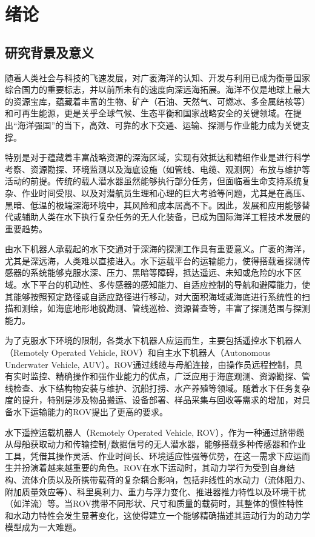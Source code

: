 \chapter{绪论}

\section{研究背景及意义}
随着人类社会与科技的飞速发展，对广袤海洋的认知、开发与利用已成为衡量国家综合国力的重要标志，并以前所未有的速度向深远海拓展。海洋不仅是地球上最大的资源宝库，蕴藏着丰富的生物、矿产（石油、天然气、可燃冰、多金属结核等）和可再生能源，更是关乎全球气候、生态平衡和国家战略安全的关键领域。在提出“海洋强国”的当下，高效、可靠的水下交通、运输、探测与作业能力成为关键支撑。

特别是对于蕴藏着丰富战略资源的深海区域，实现有效抵达和精细作业是进行科学考察、资源勘探、环境监测以及海底设施（如管线、电缆、观测网）布放与维护等活动的前提。传统的载人潜水器虽然能够执行部分任务，但面临着生命支持系统复杂、作业时间受限、以及对潜航员生理和心理的巨大考验等问题，尤其是在高压、黑暗、低温的极端深海环境中，其风险和成本居高不下。因此，发展和应用能够替代或辅助人类在水下执行复杂任务的无人化装备，已成为国际海洋工程技术发展的重要趋势。

由水下机器人承载起的水下交通对于深海的探测工作具有重要意义。广袤的海洋，尤其是深远海，人类难以直接进入。水下运载平台的运输能力，使得搭载着探测传感器的系统能够克服水深、压力、黑暗等障碍，抵达遥远、未知或危险的水下区域。水下平台的机动性、多传感器的感知能力、自适应控制的导航和避障能力，使其能够按照预定路径或自适应路径进行移动，对大面积海域或海底进行系统性的扫描和测绘，如海底地形地貌勘测、管线巡检、资源普查等，丰富了探测范围与探测能力。\cite{CaiWeiZiZhuShuiXiaJiQiRenHaiDiReYeQuYingYongZongShu2023}

为了克服水下环境的限制，各类水下机器人应运而生，主要包括遥控水下机器人（Remotely Operated Vehicle, ROV）和自主水下机器人（Autonomous Underwater Vehicle, AUV）。ROV通过线缆与母船连接，由操作员远程控制，具有实时监控、精确操作和强作业能力的优点，广泛应用于海底观测、资源勘探、管线检查、水下结构物安装与维护、沉船打捞、水产养殖等领域。随着水下任务复杂度的提升，特别是涉及物品搬运、设备部署、样品采集与回收等需求的增加，对具备水下运输能力的ROV提出了更高的要求。

水下遥控运载机器人（Remotely Operated Vehicle, ROV），作为一种通过脐带缆从母船获取动力和传输控制/数据信号的无人潜水器，能够搭载多种传感器和作业工具，凭借其操作灵活、作业时间长、环境适应性强等优势，在这一需求下应运而生并扮演着越来越重要的角色。ROV在水下运动时，其动力学行为受到自身结构、流体介质以及所携带载荷的复杂耦合影响，包括非线性的水动力（流体阻力、附加质量效应等）、科里奥利力、重力与浮力变化、推进器推力特性以及环境干扰（如洋流）等。当ROV携带不同形状、尺寸和质量的载荷时，其整体的惯性特性和水动力特性会发生显著变化，这使得建立一个能够精确描述其运动行为的动力学模型成为一大难题。


